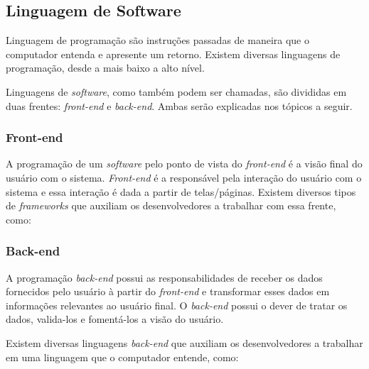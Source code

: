 \subsection{Linguagem de Software}

Linguagem de programação são instruções passadas de maneira que o computador entenda e apresente um retorno. Existem diversas linguagens de programação, desde a mais baixo a alto nível.

Linguagens de \textit{software}, como também podem ser chamadas, são divididas em duas frentes: \textit{front-end} e \textit{back-end}. Ambas serão explicadas nos tópicos a seguir.

\subsubsection{Front-end}
\label{sec:front-end}

A programação de um \textit{software} pelo ponto de vista do \textit{front-end} é a visão final do usuário com o sistema. \textit{Front-end} é a responsável pela interação do usuário com o sistema e essa interação é dada a partir de telas/páginas. Existem diversos tipos de \textit{frameworks} que auxiliam os desenvolvedores a trabalhar com essa frente, como:


\subsubsection{Back-end}
\label{sec:back-end}

A programação \textit{back-end} possui as responsabilidades de receber os dados fornecidos pelo usuário à partir do \textit{front-end} e transformar esses dados em informações relevantes ao usuário final. O \textit{back-end} possui o dever de tratar os dados, valida-los e fomentá-los a visão do usuário.

Existem diversas linguagens \textit{back-end} que auxiliam os desenvolvedores a trabalhar em uma linguagem que o computador entende, como:


